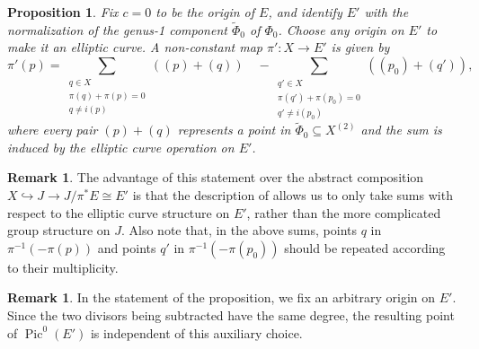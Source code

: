 \documentclass[a4paper,twoside,english]{amsart}
\theoremstyle{plain}
\newtheorem{proposition}[theorem]{Proposition}
\theoremstyle{definition}
\newtheorem{remark}[theorem]{Remark}
\begin{document}
\begin{proposition}
\label{prop: complementary map}
    Fix $c=0$ to be the origin of $E$, and identify $E'$ with the normalization of the genus-1 component $\tilde{\Phi}_0$ of $\Phi_0$. Choose any origin on $E'$ to make it an elliptic curve. A non-constant map $\pi':X\to E'$ is given by
    \[
        \pi'(p) =
        \sum_{\substack{q \in X \\ \pi(q)+\pi(p)=0 \\ q \neq i(p)}} ((p)+(q)) \quad
        - \sum_{\substack{q' \in X \\ \pi(q')+\pi(p_0)=0 \\ q' \neq i(p_0)}} ((p_0)+(q')),
    \]
    where every pair $(p)+(q)$ represents a point in $\tilde{\Phi}_0 \subseteq X^{(2)}$ and the sum is induced by the elliptic curve operation on $E'$. 
\end{proposition}
\begin{remark}
    The advantage of this statement over the abstract composition $X \hookrightarrow J \to J/\pi^*E \cong E'$ is that the description of  allows us to only take sums with respect to the elliptic curve structure on $E'$, rather than the more complicated group structure on $J$. Also note that, in the above sums, points $q$ in $\pi^{-1}(-\pi(p))$ and points $q'$ in $\pi^{-1}(-\pi(p_0))$ should be repeated according to their multiplicity.
\end{remark}
\begin{remark}
    In the statement of the proposition, we fix an arbitrary origin on $E'$. Since the two divisors being subtracted have the same degree, the resulting point of $\operatorname{Pic}^0(E')$ is independent of this auxiliary choice.
\end{remark}
\end{document}
